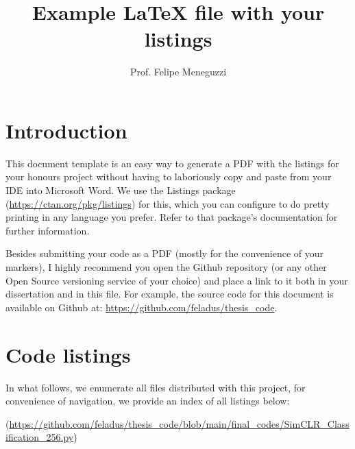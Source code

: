 \documentclass[a4paper]{article}
\title{Example LaTeX file with your listings}
\author{Prof. Felipe Meneguzzi}
\begin{document}
\maketitle

\section*{Introduction}

This document template is an easy way to generate a PDF with the listings for your honours project without having to laboriously copy and paste from your IDE into Microsoft Word. We use the Listings package (\url{https://ctan.org/pkg/listings}) for this, which you can configure to do pretty printing in any language you prefer. Refer to that package's documentation for further information. 

Besides submitting your code as a PDF (mostly for the convenience of your markers), I highly recommend you open the Github repository (or any other Open Source versioning service of your choice) and place a link to it both in your dissertation and in this file. 
For example, the source code for this document is available on Github at: \url{https://github.com/feladus/thesis_code}.

\section*{Code listings}

In what follows, we enumerate all files distributed with this project, for convenience of navigation, we provide an index of all listings below:

\lstlistoflistings

(\url{https://github.com/feladus/thesis_code/blob/main/final_codes/SimCLR_Classification_256.py})



% 

% 

% 

% 

% 
\end{document}
